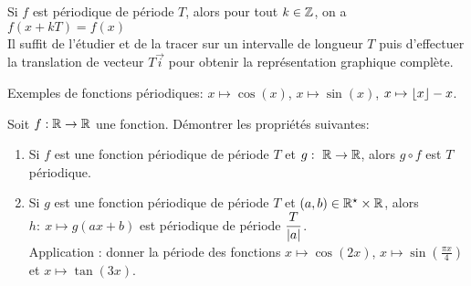 \documentclass[a4paper, 11pt]{article}
\begin{document}
\begin{rem} Si $f$ est p\'eriodique de p\'eriode $T$, alors pour tout $k \in \mathbb{Z}$, on a $f(x+kT)=f(x)$\\
Il suffit de l'\'etudier et de la tracer sur un intervalle de longueur $T$ puis d'effectuer la translation de vecteur $T\vec{i}$ pour obtenir la repr\'esentation graphique compl\`{e}te.
\end{rem}


\begin{exemples} Exemples de fonctions p\'eriodiques: $x\mapsto \cos(x)$, $x\mapsto \sin(x)$, $x\mapsto \left \lfloor x\right \rfloor-x$.
\end{exemples}

\vspace{0.1cm}

{\footnotesize
\begin{exercice} Soit $f:\mathbb{R}\rightarrow \mathbb{R}$ une fonction. D\'emontrer les propri\'et\'es suivantes:
\begin{enumerate}
\item Si $f$ est une fonction p\'eriodique de p\'eriode $T$ et $g:\ \mathbb{R}\rightarrow \mathbb{R}$, alors $g\circ f$ est $T$ p\'eriodique.
\item Si $g$ est une fonction p\'eriodique de p\'eriode $T$ et $(a,b)\in \mathbb{R}^{\star}\times \mathbb{R}$, alors $h:\ x\mapsto g(ax+b)$ est p\'eriodique de p\'eriode $\displaystyle\frac{T}{|a|}$.\\
Application : donner la p\'eriode des fonctions $x \mapsto \cos(2x)$, $x \mapsto \sin\left(\frac{\pi x}{4}\right)$ et $x \mapsto \tan(3x)$.
\end{enumerate}
\end{exercice}}



\end{document}
